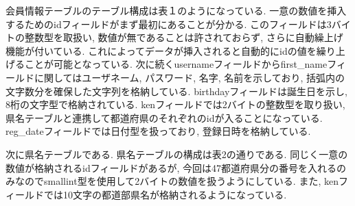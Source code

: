 \documentclass[submit,techrep]{ipsj}
\begin{document}
会員情報テーブルのテーブル構成は表１のようになっている. 一意の数値を挿入するためのidフィールドがまず最初にあることが分かる. 
このフィールドは3バイトの整数型を取扱い, 数値が無であることは許されておらず, さらに自動繰上げ機能が付いている. これによってデータが挿入されると自動的にidの値を繰り上げることが可能となっている. 
次に続くusernameフィールドからfirst\_nameフィールドに関してはユーザネーム, パスワード, 名字, 名前を示しており, 括弧内の文字数分を確保した文字列を格納している. birthdayフィールドは誕生日を示し, 8桁の文字型で格納されている. kenフィールドでは2バイトの整数型を取り扱い, 県名テーブルと連携して都道府県のそれぞれのidが入ることになっている. 
reg\_dateフィールドでは日付型を扱っており, 登録日時を格納している. 
\begin{table}[htb]
\centering
  \caption{会員情報テーブル構成}
\end{table}

次に県名テーブルである. 県名テーブルの構成は表2の通りである. 同じく一意の数値が格納されるidフィールドがあるが, 今回は47都道府県分の番号を入れるのみなのでsmallint型を使用して2バイトの数値を扱うようにしている. 
また, kenフィールドでは10文字の都道部県名が格納されるようになっている. 

\begin{table}[htb]
\centering
  \caption{県名テーブル構成}
\end{table}
\end{document}
